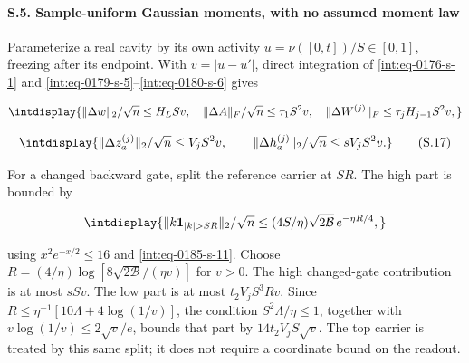 \paragraph{S.5. Sample-uniform Gaussian moments, with no assumed moment law}

\mbox{}\par\smallskip


Parameterize a real cavity by its own activity \(u=\nu([0,\allowbreak t])/S\in[0,\allowbreak 1]\), freezing after its endpoint. With \(v=|u-u'|\), direct integration of \eqref{int:eq-0176-s-1} and \eqref{int:eq-0179-s-5}--\allowbreak \eqref{int:eq-0180-s-6} gives


\begingroup\renewcommand{\theHequation}{intdisplay.389}
\begin{equation*}
\intdisplay{
\|\Delta w\|_2/\sqrt n\le H_LSv,\quad
\|\Delta A\|_F/\sqrt n\le\tau_1S^2v,\quad
\|\Delta W^{(j)}\|_F\le\tau_jH_{j-1}S^2v,
}
\end{equation*}
\endgroup

\begingroup\renewcommand{\theHequation}{intdisplay.390}
\begin{equation}
\intdisplay{
\|\Delta z_a^{(j)}\|_2/\sqrt n\le V_jS^2v,\qquad
\|\Delta h_a^{(j)}\|_2/\sqrt n\le sV_jS^2v.
}
\tag{S.17}
\label{int:eq-0191-s-17}
\end{equation}
\endgroup


For a changed backward gate, split the reference carrier at \(SR\). The high part is bounded by


\begingroup\renewcommand{\theHequation}{intdisplay.391}
\begin{equation*}
\intdisplay{
\|k\mathbf1_{|k|>SR}\|_2/\sqrt n
 \le(4S/\eta)\sqrt{2\mathcal B}\,e^{-\eta R/4},
}
\end{equation*}
\endgroup


using \(x^2e^{-x/2}\le16\) and \eqref{int:eq-0185-s-11}. Choose \(R=(4/\eta)\log[8\sqrt{2\mathcal B}/(\eta v)]\) for \(v>0\). The high changed-gate contribution is at most \(sSv\). The low part is at most \(t_2V_jS^3Rv\). Since \(R\le\eta^{-1}[10\Lambda+4\log(1/v)]\), the condition \(S^2\Lambda/\eta\le1\), together with \(v\log(1/v)\le2\sqrt v/e\), bounds that part by \(14t_2V_jS\sqrt v\). The top carrier is treated by this same split; it does not require a coordinate bound on the readout.


